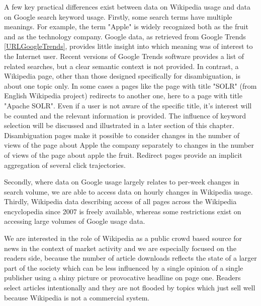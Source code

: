 \documentclass[a4paper,10pt]{scrbook}
\begin{document}
A few key practical differences exist between data on Wikipedia usage and data on Google search keyword usage. 
Firstly, some search terms have multiple meanings. For example, the term "Apple" is widely recognized both as the fruit and as the technology company. Google data, as retrieved from Google Trends \ref{URLGoogleTrends}, provides little insight into which meaning was of interest to the Internet user. Recent versions of Google Trends software provides a list of related searches, but a clear semantic context is not provided. In contrast, a Wikipedia page, other than those designed specifically for disambiguation, is about one topic only. In some cases a pages like the page with title "SOLR" (from English Wikipedia project) redirects to another one, here to a page with title "Apache SOLR". Even if a user is not aware of the specific title, it's interest will be counted and the relevant information is provided. The influence of keyword selection will be discussed and illustrated in a later section of this chapter. Disambiguation pages make it possible to consider changes in the number of views of the page about Apple the company separately to changes in the number of views of the page about apple the fruit. Redirect pages provide an implicit aggregation of several click trajectories.

Secondly, where data on Google usage largely relates to per-week changes in search volume, we are able to access data on hourly changes in Wikipedia usage. Thirdly, Wikipedia data describing access of all pages across the Wikipedia encyclopedia since 2007 is freely available, whereas some restrictions exist on accessing large volumes of Google usage data.

We are interested in the role of Wikipedia as a public crowd based source for news in the context of market activity and we are especially focused on the readers side, because the number of article downloads reflects the state of a larger part of the society which can be less influenced by a single opinion of a single publisher using a shiny picture or provocative headline on page one. Readers select articles intentionally and they are not flooded by topics which just sell well because Wikipedia is not a commercial system.\\
\end{document}
